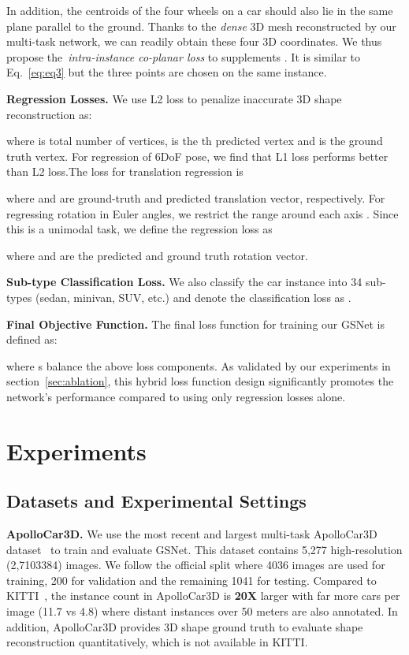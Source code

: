 \documentclass[runningheads]{llncs}
\begin{document}
In addition, the centroids of the four wheels on a car should also lie in the same plane parallel to the ground. Thanks to the \textit{dense} 3D mesh reconstructed by our multi-task network, we can readily obtain these four 3D coordinates. We thus propose the~\textit{intra-instance co-planar loss}  to supplements . It is similar to Eq.~\ref{eq:eq3} but the three points are chosen on the same instance. 

\smallskip\noindent\textbf{Regression Losses.}
We use L2 loss  to penalize inaccurate 3D shape reconstruction as:

where  is total number of vertices,  is the th predicted vertex and  is the ground truth vertex. For regression of 6DoF pose, we find that L1 loss performs better than L2 loss.The loss for translation regression is

where  and  are ground-truth and predicted translation vector, respectively. 
For regressing rotation in Euler angles, we restrict the range around each axis . Since this is a unimodal task, we define the regression loss as

where  and  are the predicted and ground truth rotation vector.

\smallskip\noindent\textbf{Sub-type Classification Loss.}
We also classify the car instance into 34 sub-types (sedan, minivan, SUV, etc.) and denote the classification loss as .

\smallskip\noindent\textbf{Final Objective Function.}
The final loss function  for training our GSNet is defined as:

where s balance the above loss components. As validated by our experiments in section~\ref{sec:ablation}, this hybrid loss function design significantly promotes the network's performance compared to using only regression losses alone. 


\section{Experiments}
\label{sec:exp} 
\subsection{Datasets and Experimental Settings}

\smallskip\noindent\textbf{ApolloCar3D.}
We use the most recent and largest multi-task ApolloCar3D dataset~\cite{song2019apollocar3d} to train and evaluate GSNet. This dataset contains 5,277 high-resolution (2,7103384) images. We follow the official split where 4036 images are used for training, 200 for validation and the remaining 1041 for testing. Compared to KITTI~\cite{geiger2012we}, the instance count in ApolloCar3D is \textbf{20X} larger with far more cars per image (11.7 vs 4.8) where distant instances over 50 meters are also annotated. In addition,  ApolloCar3D provides 3D shape ground truth to evaluate shape reconstruction quantitatively, which is not available in KITTI.
\end{document}
